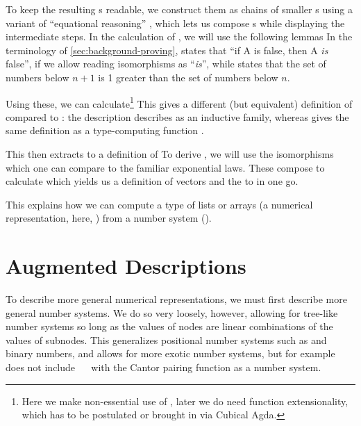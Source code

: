 To keep the resulting s readable, we construct them as chains of smaller s using a variant of ``equational reasoning'' \cite{agdastdlib, plfa}, which lets us compose s while displaying the intermediate steps. In the calculation of , we will use the following lemmas
In the terminology of \autoref{sec:background-proving},  states that ``if A is false, then A \emph{is} false'', if we allow reading isomorphisms as ``\emph{is}'', while  states that the set of numbers below $n+1$ is 1 greater than the set of numbers below $n$.

Using these, we can calculate\footnote{Here we make non-essential use of , later we do need function extensionality, which has to be postulated or brought in via Cubical Agda.}
This gives a different (but equivalent) definition of  compared to : the description  describes  as an inductive family, whereas  gives the same definition as a type-computing function \cite{progorn}.

This  then extracts to a definition of 
To derive , we will use the isomorphisms
which one can compare to the familiar exponential laws. These compose to calculate
which yields us a definition of vectors
and the  to  in one go.

This explains how we can compute a type of lists or arrays (a numerical representation, here, ) from a number system (\bN{}).


\section{Augmented Descriptions}
To describe more general numerical representations, we must first describe more general number systems. We do so very loosely, however, allowing for tree-like number systems so long as the values of nodes are linear combinations of the values of subnodes. This generalizes positional number systems such as \bN{} and binary numbers, and allows for more exotic number systems, but for example does not include \bN{}\ \ \bN{} with the Cantor pairing function as a number system.

